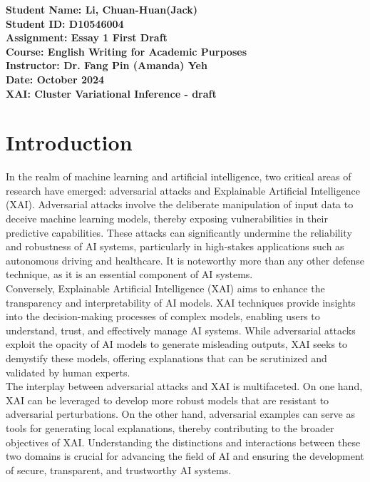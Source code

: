 \documentclass[12pt]{article}
\begin{document}
\raggedright
\textbf{Student Name: Li, Chuan-Huan(Jack)} \\
\textbf{Student ID: D10546004} \\
\textbf{Assignment: Essay 1 First Draft} \\
\textbf{Course: English Writing for Academic Purposes} \\
\textbf{Instructor: Dr. Fang Pin (Amanda) Yeh} \\
\textbf{Date: October 2024} \\
\vspace{2cm} %
\centering
{\LARGE \textbf{XAI: Cluster Variational Inference - draft}} \\
\vspace{2cm} %

\raggedright
\section{Introduction}

In the realm of machine learning and artificial intelligence, two critical areas of research have emerged: adversarial attacks and Explainable Artificial Intelligence (XAI). 
Adversarial attacks involve the deliberate manipulation of input data to deceive machine learning models, thereby exposing vulnerabilities in their predictive capabilities\cite{Goodfellow2015}\cite{Kurakin2017}. 
These attacks can significantly undermine the reliability and robustness of AI systems, particularly in high-stakes applications such as autonomous driving and healthcare. 
It is noteworthy more than any other defense technique, as it is an essential component of AI systems\cite{Ross2017}\cite{Carlini2017}.\\


Conversely, Explainable Artificial Intelligence (XAI) aims to enhance the transparency and interpretability of AI models\cite{Comaniciu2002}. 
XAI techniques provide insights into the decision-making processes of complex models, enabling users to understand, trust, and effectively manage AI systems.
While adversarial attacks exploit the opacity of AI models to generate misleading outputs, XAI seeks to demystify these models, offering explanations that can be scrutinized and validated by human experts. \\


The interplay between adversarial attacks and XAI is multifaceted. On one hand, XAI can be leveraged to develop more robust models that are resistant to adversarial perturbations. 
On the other hand, adversarial examples can serve as tools for generating local explanations, thereby contributing to the broader objectives of XAI.
Understanding the distinctions and interactions between these two domains is crucial for advancing the field of AI and ensuring the development of secure, transparent, and trustworthy AI systems. \\
\end{document}
